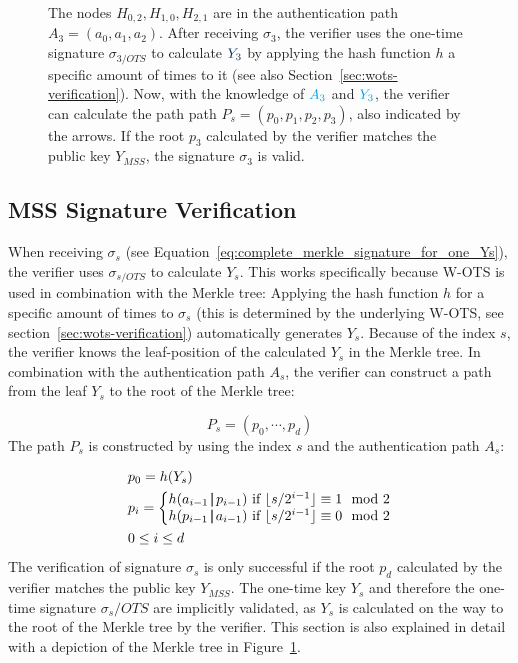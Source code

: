 \begin{figure}
{The nodes $H_{0,2}, H_{1,0}, H_{2,1}$ are in the \textcolor{cyan_tud}{authentication path $A_3 = (a_0, a_1, a_2)$}. After receiving $\sigma_3$, the verifier uses the one-time signature \textcolor{cyan_tud}{$\sigma_{3/OTS}$} to calculate $\textcolor{darkblue_tud}{Y_3}$ by applying the hash function $h$ a specific amount of times to it (see also Section~\ref{sec:wots-verification}).
Now, with the knowledge of $\textcolor{cyan_tud}{A_3}$ and $\textcolor{cyan_tud}{Y_3}$, the verifier can calculate the path \textcolor{darkblue_tud}{path $P_s = (p_0, p_1, p_2, p_3)$}, also indicated by the arrows. If the root $p_3$ calculated by the verifier matches the public key $Y_{MSS}$, the signature $\sigma_3$ is valid.}
\label{img:merkle_tree_signature_gen}
\end{figure}


\subsection{MSS Signature Verification}
\label{sec:mss_sign_verif}
When receiving $\sigma_s$ (see Equation~\ref{eq:complete_merkle_signature_for_one_Ys}), the verifier uses $\sigma_{s/OTS}$ to calculate $Y_s$. This works specifically because W-OTS is used in combination with the Merkle tree: Applying the hash function $h$ for a specific amount of times to $\sigma_s$ (this is determined by the underlying W-OTS, see section~\ref{sec:wots-verification}) automatically generates $Y_s$.
Because of the index $s$, the verifier knows the leaf-position of the calculated $Y_s$ in the Merkle tree. 
In combination with the authentication path $A_s$, the verifier can construct a path from the leaf $Y_s$ to the root of the Merkle tree: 

\begin{equation}
P_s = (p_0, \cdots, p_d)
\end{equation}
The path $P_s$ is constructed by using the index $s$ and the authentication path $A_s$:

\begin{align}
\label{eq:merkle_verifier_path_calculation}
&p_0 = h(Y_s) \\
&p_{i} = 
\left\{\begin{matrix} \nonumber
h(a_{i-1} \operatorname{|\!\!|} p_{i-1}) \text{ if } \lfloor s/2^{i-1}\rfloor \equiv 1 \mod{2} \\
h(p_{i-1} \operatorname{|\!\!|} a_{i-1}) \text{ if } \lfloor s/2^{i-1}\rfloor \equiv 0 \mod{2}
\end{matrix}\right.  \nonumber \\
&0 \leq i \leq d  \nonumber 
\end{align}
The verification of signature $\sigma_s$ is only successful if the root $p_d$ calculated by the verifier matches the public key $Y_{MSS}$. The one-time key $Y_s$ and therefore the one-time signature $\sigma_s/OTS$ are implicitly validated, as $Y_s$ is calculated on the way to the root of the Merkle tree by the verifier.
This section is also explained in detail with a depiction of the Merkle tree in Figure~\ref{img:merkle_tree_signature_gen}.


